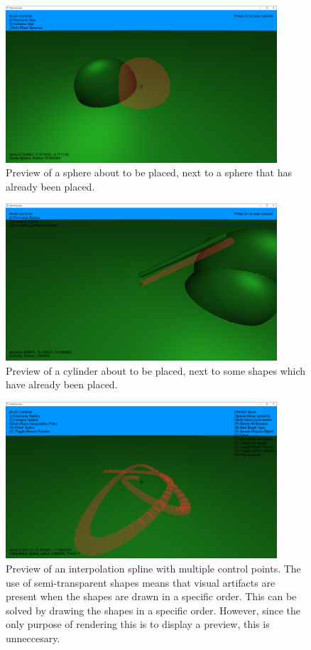 \documentclass[11pt]{article}
\begin{document}
\begin{figure}[H]
  \includegraphics[width=0.9\textwidth]{sphere_preview.png}
  \caption{Preview of a sphere about to be placed, next to a sphere that has already been placed.}
  \label{fig:sphere_preview}
\end{figure}
\begin{figure}[H]
  \includegraphics[width=0.9\textwidth]{cylinder_preview.png}
  \caption{Preview of a cylinder about to be placed, next to some shapes which have already been placed.}
  \label{fig:cylinder_preview}
\end{figure}
\begin{figure}[H]
  \includegraphics[width=0.9\textwidth]{spline_preview.png}
  \caption{Preview of an interpolation spline with multiple control points. The use of semi-transparent shapes means that visual artifacts are present when the shapes are drawn in a specific order. This can be solved by drawing the shapes in a specific order. However, since the only purpose of rendering this is to display a preview, this is unneccesary.}
  \label{fig:spline_preview}
\end{figure}
\end{document}
